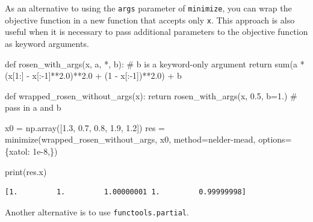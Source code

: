 \documentclass[
  letterpaper,
  DIV=11,
  numbers=noendperiod]{scrreprt}
\newenvironment{Shaded}{\begin{snugshade}}{\end{snugshade}}
\newcommand{\BuiltInTok}[1]{\textcolor[rgb]{0.00,0.23,0.31}{#1}}
\newcommand{\CommentTok}[1]{\textcolor[rgb]{0.37,0.37,0.37}{#1}}
\newcommand{\ControlFlowTok}[1]{\textcolor[rgb]{0.00,0.23,0.31}{#1}}
\newcommand{\DecValTok}[1]{\textcolor[rgb]{0.68,0.00,0.00}{#1}}
\newcommand{\FloatTok}[1]{\textcolor[rgb]{0.68,0.00,0.00}{#1}}
\newcommand{\KeywordTok}[1]{\textcolor[rgb]{0.00,0.23,0.31}{#1}}
\newcommand{\NormalTok}[1]{\textcolor[rgb]{0.00,0.23,0.31}{#1}}
\newcommand{\OperatorTok}[1]{\textcolor[rgb]{0.37,0.37,0.37}{#1}}
\newcommand{\StringTok}[1]{\textcolor[rgb]{0.13,0.47,0.30}{#1}}
\begin{document}
As an alternative to using the \texttt{args} parameter of
\texttt{minimize}, you can wrap the objective function in a new function
that accepts only \texttt{x}. This approach is also useful when it is
necessary to pass additional parameters to the objective function as
keyword arguments.

\begin{Shaded}
\begin{Highlighting}[]
\KeywordTok{def}\NormalTok{ rosen\_with\_args(x, a, }\OperatorTok{*}\NormalTok{, b):  }\CommentTok{\# b is a keyword{-}only argument}
    \ControlFlowTok{return} \BuiltInTok{sum}\NormalTok{(a }\OperatorTok{*}\NormalTok{ (x[}\DecValTok{1}\NormalTok{:] }\OperatorTok{{-}}\NormalTok{ x[:}\OperatorTok{{-}}\DecValTok{1}\NormalTok{]}\OperatorTok{**}\FloatTok{2.0}\NormalTok{)}\OperatorTok{**}\FloatTok{2.0} \OperatorTok{+}\NormalTok{ (}\DecValTok{1} \OperatorTok{{-}}\NormalTok{ x[:}\OperatorTok{{-}}\DecValTok{1}\NormalTok{])}\OperatorTok{**}\FloatTok{2.0}\NormalTok{) }\OperatorTok{+}\NormalTok{ b}

\KeywordTok{def}\NormalTok{ wrapped\_rosen\_without\_args(x):}
    \ControlFlowTok{return}\NormalTok{ rosen\_with\_args(x, }\FloatTok{0.5}\NormalTok{, b}\OperatorTok{=}\FloatTok{1.}\NormalTok{)  }\CommentTok{\# pass in \textasciigrave{}a\textasciigrave{} and \textasciigrave{}b\textasciigrave{}}

\NormalTok{x0 }\OperatorTok{=}\NormalTok{ np.array([}\FloatTok{1.3}\NormalTok{, }\FloatTok{0.7}\NormalTok{, }\FloatTok{0.8}\NormalTok{, }\FloatTok{1.9}\NormalTok{, }\FloatTok{1.2}\NormalTok{])}
\NormalTok{res }\OperatorTok{=}\NormalTok{ minimize(wrapped\_rosen\_without\_args, x0, method}\OperatorTok{=}\StringTok{\textquotesingle{}nelder{-}mead\textquotesingle{}}\NormalTok{,}
\NormalTok{               options}\OperatorTok{=}\NormalTok{\{}\StringTok{\textquotesingle{}xatol\textquotesingle{}}\NormalTok{: }\FloatTok{1e{-}8}\NormalTok{,\})}

\BuiltInTok{print}\NormalTok{(res.x)}
\end{Highlighting}
\end{Shaded}

\begin{verbatim}
[1.         1.         1.00000001 1.         0.99999998]
\end{verbatim}

Another alternative is to use \texttt{functools.partial}.
\end{document}
